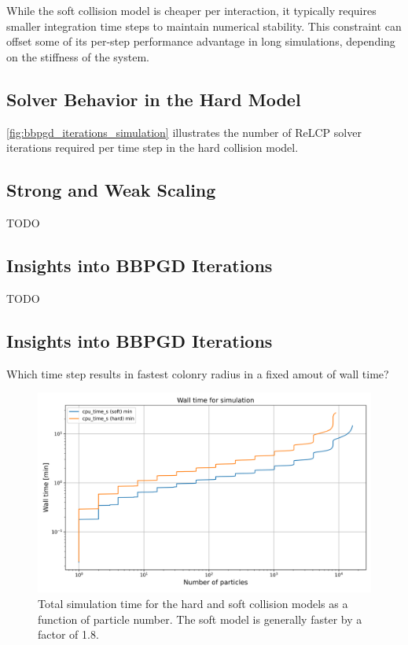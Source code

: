 \documentclass[conference]{IEEEtran}
\begin{document}
While the soft collision model is cheaper per interaction, it typically requires smaller integration time steps
to maintain numerical stability. This constraint can offset some of its per-step performance advantage
in long simulations, depending on the stiffness of the system.

\subsection{Solver Behavior in the Hard Model}

\autoref{fig:bbpgd_iterations_simulation} illustrates the number of ReLCP solver iterations required per time step in the hard collision model.


\subsection{Strong and Weak Scaling}

TODO

\subsection{Insights into BBPGD Iterations}

TODO



\subsection{Insights into BBPGD Iterations}

Which time step results in fastest colonry radius in a fixed amout of wall time?



\begin{figure}[h]
    \centering
    \includegraphics[width=\linewidth]{figures/comparisons/wall_time_simulation.png}
    \caption{Total simulation time for the hard and soft collision models as a function of particle number. The soft model is generally faster by a factor of 1.8.} \label{fig:wall_time_simulation}
\end{figure}
\end{document}
